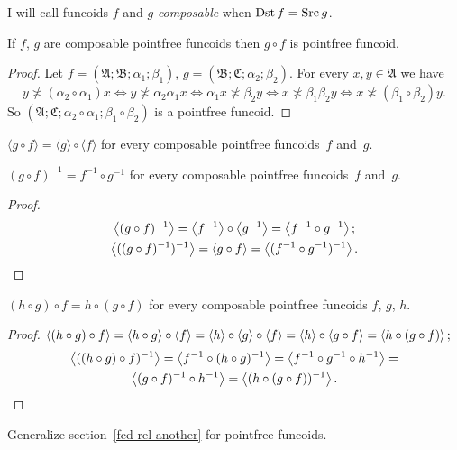 \begin{defn}
I will call funcoids $f$ and
$g$ \emph{composable} when $\operatorname{Dst} f=\operatorname{Src} g$.\end{defn}
\begin{prop}
If $f$, $g$ are composable pointfree funcoids then $g\circ f$ is
pointfree funcoid.\end{prop}
\begin{proof}
Let $f=(\mathfrak{A};\mathfrak{B};\alpha_{1};\beta_{1})$, $g=(\mathfrak{B};\mathfrak{C};\alpha_{2};\beta_{2})$.
For every $x,y\in\mathfrak{A}$ we have 
\[
y\nasymp(\alpha_{2}\circ\alpha_{1})x\Leftrightarrow y\nasymp\alpha_{2}\alpha_{1}x\Leftrightarrow\alpha_{1}x\nasymp\beta_{2}y\Leftrightarrow x\nasymp\beta_{1}\beta_{2}y\Leftrightarrow x\nasymp(\beta_{1}\circ\beta_{2})y.
\]
So $(\mathfrak{A};\mathfrak{C};\alpha_{2}\circ\alpha_{1};\beta_{1}\circ\beta_{2})$
is a pointfree funcoid.\end{proof}
\begin{obvious}
$\langle g\circ f\rangle=\langle g\rangle\circ\langle f\rangle$ for
every composable pointfree funcoids~$f$ and~$g$.\end{obvious}
\begin{thm}
$(g\circ f)^{-1}=f^{-1}\circ g^{-1}$ for every composable pointfree
funcoids~$f$ and~$g$.\end{thm}
\begin{proof}
~
\begin{gather*}
\left\langle (g\circ f)^{-1}\right\rangle=\left\langle f^{-1}\right\rangle\circ\left\langle g^{-1}\right\rangle=\left\langle f^{-1}\circ g^{-1}\right\rangle;\\
\left\langle ((g\circ f)^{-1})^{-1}\right\rangle=\left\langle g\circ f\right\rangle=\left\langle (f^{-1}\circ g^{-1})^{-1}\right\rangle.
\end{gather*}
\end{proof}
\begin{prop}
$(h\circ g)\circ f=h\circ(g\circ f)$ for every composable pointfree
funcoids $f$, $g$, $h$.\end{prop}
\begin{proof}
$\left\langle (h\circ g)\circ f\right\rangle=\left\langle h\circ g\right\rangle\circ\left\langle f\right\rangle=\left\langle h\right\rangle\circ\left\langle g\right\rangle\circ\left\langle f\right\rangle=\left\langle h\right\rangle\circ\left\langle g\circ f\right\rangle=\left\langle h\circ(g\circ f)\right\rangle;$
\begin{multline*}
\left\langle ((h\circ g)\circ f)^{-1}\right\rangle=\left\langle f^{-1}\circ(h\circ g)^{-1}\right\rangle=\left\langle f^{-1}\circ g^{-1}\circ h^{-1}\right\rangle=\\
\left\langle (g\circ f)^{-1}\circ h^{-1}\right\rangle=\left\langle (h\circ(g\circ f))^{-1}\right\rangle.
\end{multline*}
\end{proof}
\begin{xca}
Generalize section~\ref{fcd-rel-another} for pointfree funcoids.
\end{xca}

